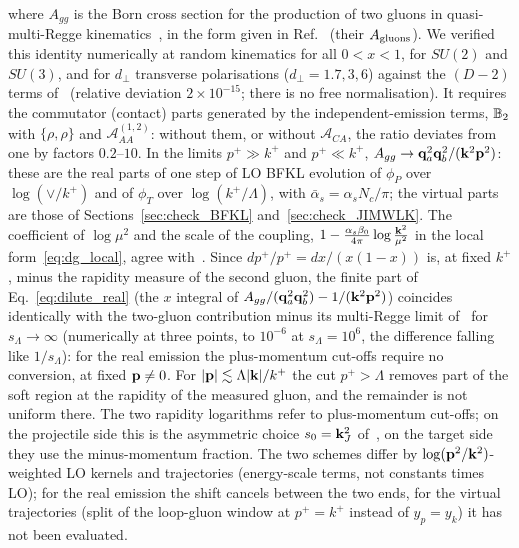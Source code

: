 where $A_{gg}$ is the Born cross section for the production of two gluons in quasi-multi-Regge kinematics~\cite{Fadin:1998py}, in the form given in Ref.~\cite{Bartels:2006hg} (their $A_{\rm gluons}$). We verified this identity numerically at random kinematics for all $0<x<1$, for $SU(2)$ and $SU(3)$, and for $d_\perp$ transverse polarisations ($d_\perp=1.7,3,6$) against the $(D-2)$ terms of~\cite{Bartels:2006hg} (relative deviation $2\times10^{-15}$; there is no free normalisation). It requires the commutator (contact) parts generated by the independent-emission terms, $\mathbb{B}_2$ with $\{\rho,\rho\}$ and $\mathcal A^{(1,2)}_{AA}$: without them, or without $\mathcal A_{CA}$, the ratio deviates from one by factors $0.2$--$10$. In the limits $p^+\gg k^+$ and $p^+\ll k^+$, $A_{gg}\to\mathbf{q}_a^2\mathbf{q}_b^2/(\mathbf{k}^2\mathbf{p}^2)$: these are the real parts of one step of LO BFKL evolution of $\phi_P$ over $\log(\vee/k^+)$ and of $\phi_T$ over $\log(k^+/\Lambda)$, with $\bar\alpha_s=\alpha_sN_c/\pi$; the virtual parts are those of Sections~\ref{sec:check_BFKL} and~\ref{sec:check_JIMWLK}. The coefficient of $\log\mu^2$ and the scale of the coupling, $1-\frac{\alpha_s\beta_0}{4\pi}\log\frac{\mathbf{k}^2}{\mu^2}$ in the local form~\eqref{eq:dg_local}, agree with~\cite{Fadin:1998py,Bartels:2006hg}. Since $dp^+/p^+=dx/(x(1-x))$ is, at fixed $k^+$, minus the rapidity measure of the second gluon, the finite part of Eq.~\eqref{eq:dilute_real} (the $x$ integral of $A_{gg}/(\mathbf{q}_a^2\mathbf{q}_b^2)-1/(\mathbf{k}^2\mathbf{p}^2)$) coincides identically with the two-gluon contribution minus its multi-Regge limit of~\cite{Bartels:2006hg} for $s_\Lambda\to\infty$ (numerically at three points, to $10^{-6}$ at $s_\Lambda=10^6$, the difference falling like $1/s_\Lambda$): for the real emission the plus-momentum cut-offs require no conversion, at fixed $\mathbf{p}\neq0$. For $|\mathbf{p}|\lesssim\Lambda|\mathbf{k}|/k^+$ the cut $p^+>\Lambda$ removes part of the soft region at the rapidity of the measured gluon, and the remainder is not uniform there. The two rapidity logarithms refer to plus-momentum cut-offs; on the projectile side this is the asymmetric choice $s_0=\mathbf{k}_J^2$ of~\cite{Bartels:2006hg}, on the target side they use the minus-momentum fraction. The two schemes differ by $\log(\mathbf{p}^2/\mathbf{k}^2)$-weighted LO kernels and trajectories (energy-scale terms, not constants times LO); for the real emission the shift cancels between the two ends, for the virtual trajectories (split of the loop-gluon window at $p^+=k^+$ instead of $y_p=y_k$) it has not been evaluated.

